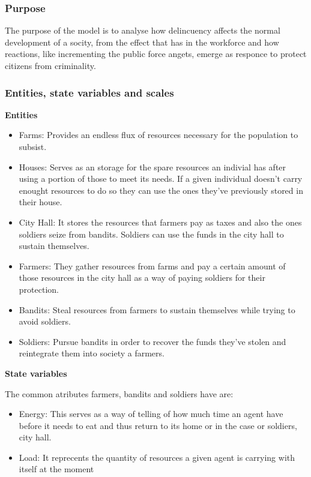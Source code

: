 \documentclass{wscpaperproc}
\theoremstyle{wsc}
\begin{document}
\subsubsection{Purpose}

The purpose of the model is to analyse how delincuency affects the normal
development of a socity, from the effect that has in the workforce and how
reactions, like incrementing the public force angets, emerge as responce to
protect citizens from criminality.

\subsubsection{Entities, state variables and scales}
\noindent \textbf{Entities}

\begin{itemize}
    \item Farms: Provides an endless flux of resources necessary for the population to subsist.
    \item Houses: Serves as an storage for the spare resources an indivial has after using a portion
          of those to meet its needs. If a given individual doesn't carry enought resources
          to do so they can use the ones they've previously stored in their house.
    \item City Hall: It stores the resources that farmers pay as taxes and also the ones soldiers
          seize from bandits. Soldiers can use the funds in the city hall to sustain themselves.
    \item Farmers: They gather resources from farms and pay a certain amount of those resources in the
          city hall as a way of paying soldiers for their protection.
    \item Bandits: Steal resources from farmers to sustain themselves while trying to avoid soldiers.
    \item Soldiers: Pursue bandits in order to recover the funds they've stolen and reintegrate them
          into society a farmers.
\end{itemize}

\noindent \textbf{State variables}

\noindent The common atributes farmers, bandits and soldiers have are:

\begin{itemize}
    \item Energy: This serves as a way of telling of how much time an agent have before it needs to
          eat and thus return to its home or in the case or soldiers, city hall.
    \item Load: It reprecents the quantity of resources a given agent is carrying with itself at the
          moment
\end{itemize}
\end{document}

